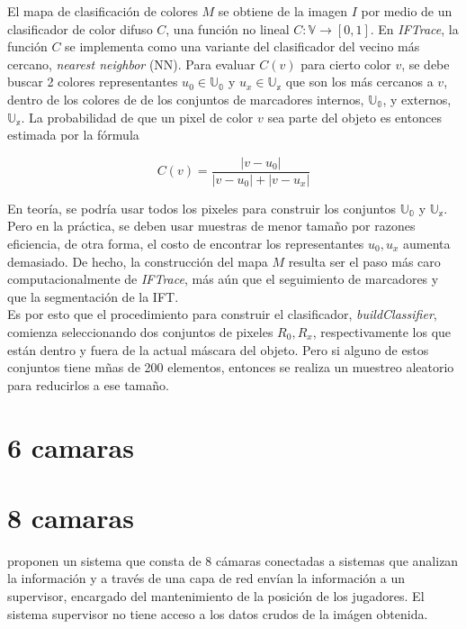 \documentclass[a4paper,10pt]{article}
\begin{document}
El mapa de clasificación de colores $M$ se obtiene de la imagen $I$ por medio de un
clasificador de color difuso $C$, una función no lineal $C : \mathbb{V} \to [0,1]$.
En \textit{IFTrace}, la función $C$ se implementa como una variante del clasificador
del vecino más cercano, \textit{nearest neighbor} (NN). Para evaluar $C(v)$ para 
cierto color $v$, se debe buscar 2 colores representantes $u_{0} \in \mathbb{U_{0}}$ 
y $u_{x} \in \mathbb{U_{x}}$ que son los más cercanos a $v$, dentro de los colores de
de los conjuntos de marcadores internos, $\mathbb{U_{0}}$, y externos, $\mathbb{U_{x}}$.
La probabilidad de que un pixel de color $v$ sea parte del objeto es entonces estimada
por la fórmula

\begin{equation}
   \label{eq:IFTrace-color-classifier}
   C(v) = \frac{|v - u_{0}|}{|v - u_{0}| + |v - u_{x}|}
\end{equation}

En teoría, se podría usar todos los pixeles para construir los conjuntos 
$\mathbb{U_{0}}$ y $\mathbb{U_{x}}$. Pero en la práctica, se deben usar muestras 
de menor tamaño por razones eficiencia, de otra forma, el costo de encontrar los
representantes $u_{0},u_{x}$ aumenta demasiado. De hecho, la construcción del mapa
$M$ resulta ser el paso más caro computacionalmente de \textit{IFTrace}, más
aún que el seguimiento de marcadores y que la segmentación de la IFT.\\
Es por esto que el procedimiento para construir el clasificador, 
\textit{buildClassifier}, comienza seleccionando dos conjuntos de pixeles 
$R_{0},R_{x}$, respectivamente los que están dentro y fuera de la actual máscara
del objeto. Pero si alguno de estos conjuntos tiene mñas de 200 elementos,
entonces se realiza un muestreo aleatorio para reducirlos a ese tamaño.

\section{6 camaras}


\section{8 camaras}

\citeauthor*{xu-8cams} proponen un sistema que consta de 8 cámaras conectadas a sistemas que 
analizan la información y a través de una capa de red envían la información a un supervisor,
encargado del mantenimiento de la posición de los jugadores. El sistema supervisor no tiene 
acceso a los datos crudos de la imágen obtenida.
\end{document}
